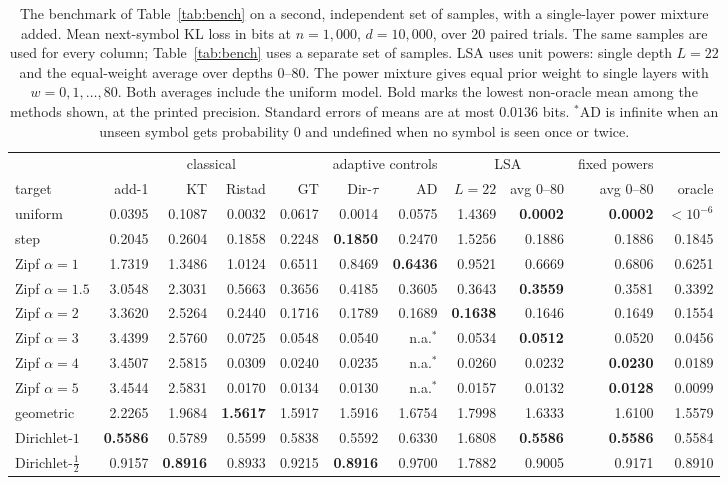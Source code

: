 \documentclass[anon]{alt2027}
\begin{document}
\begin{table}[!htbp]
\centering
\caption{The benchmark of Table~\ref{tab:bench} on a second, independent set of samples, with a single-layer power mixture added. Mean next-symbol KL loss in bits at $n=1{,}000$, $d=10{,}000$, over $20$ paired trials. The same samples are used for every column; Table~\ref{tab:bench} uses a separate set of samples. LSA uses unit powers: single depth $L=22$ and the equal-weight average over depths $0$--$80$. The power mixture gives equal prior weight to single layers with $w=0,1,\ldots,80$. Both averages include the uniform model. Bold marks the lowest non-oracle mean among the methods shown, at the printed precision. Standard errors of means are at most $0.0136$ bits. $^{*}$AD is infinite when an unseen symbol gets probability $0$ and undefined when no symbol is seen once or twice.}
\label{tab:powers-bench}
\footnotesize\setlength{\tabcolsep}{3pt}
\begin{tabular}{lrrrr|rr|rr|r|r}
\toprule
& \multicolumn{4}{c|}{classical} & \multicolumn{2}{c|}{adaptive controls} & \multicolumn{2}{c|}{LSA} & fixed powers & \\
target & add-1 & KT & Ristad & GT & Dir-$\tau$ & AD & $L=22$ & avg $0$--$80$ & avg $0$--$80$ & oracle\\
\midrule
uniform & 0.0395 & 0.1087 & 0.0032 & 0.0617 & 0.0014 & 0.0575 & 1.4369 & \textbf{0.0002} & \textbf{0.0002} & $<10^{-6}$\\
step & 0.2045 & 0.2604 & 0.1858 & 0.2248 & \textbf{0.1850} & 0.2470 & 1.5256 & 0.1886 & 0.1886 & 0.1845\\
Zipf $\alpha=1$ & 1.7319 & 1.3486 & 1.0124 & 0.6511 & 0.8469 & \textbf{0.6436} & 0.9521 & 0.6669 & 0.6806 & 0.6251\\
Zipf $\alpha=1.5$ & 3.0548 & 2.3031 & 0.5663 & 0.3656 & 0.4185 & 0.3605 & 0.3643 & \textbf{0.3559} & 0.3581 & 0.3392\\
Zipf $\alpha=2$ & 3.3620 & 2.5264 & 0.2440 & 0.1716 & 0.1789 & 0.1689 & \textbf{0.1638} & 0.1646 & 0.1649 & 0.1554\\
Zipf $\alpha=3$ & 3.4399 & 2.5760 & 0.0725 & 0.0548 & 0.0540 & n.a.$^{*}$ & 0.0534 & \textbf{0.0512} & 0.0520 & 0.0456\\
Zipf $\alpha=4$ & 3.4507 & 2.5815 & 0.0309 & 0.0240 & 0.0235 & n.a.$^{*}$ & 0.0260 & 0.0232 & \textbf{0.0230} & 0.0189\\
Zipf $\alpha=5$ & 3.4544 & 2.5831 & 0.0170 & 0.0134 & 0.0130 & n.a.$^{*}$ & 0.0157 & 0.0132 & \textbf{0.0128} & 0.0099\\
geometric & 2.2265 & 1.9684 & \textbf{1.5617} & 1.5917 & 1.5916 & 1.6754 & 1.7998 & 1.6333 & 1.6100 & 1.5579\\
Dirichlet-$1$ & \textbf{0.5586} & 0.5789 & 0.5599 & 0.5838 & 0.5592 & 0.6330 & 1.6808 & \textbf{0.5586} & \textbf{0.5586} & 0.5584\\
Dirichlet-$\frac12$ & 0.9157 & \textbf{0.8916} & 0.8933 & 0.9215 & \textbf{0.8916} & 0.9700 & 1.7882 & 0.9005 & 0.9171 & 0.8910\\
\bottomrule
\end{tabular}
\end{table}
\end{document}
